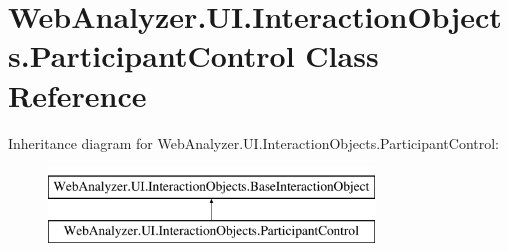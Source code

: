 \hypertarget{class_web_analyzer_1_1_u_i_1_1_interaction_objects_1_1_participant_control}{}\section{Web\+Analyzer.\+U\+I.\+Interaction\+Objects.\+Participant\+Control Class Reference}
\label{class_web_analyzer_1_1_u_i_1_1_interaction_objects_1_1_participant_control}
Inheritance diagram for Web\+Analyzer.\+U\+I.\+Interaction\+Objects.\+Participant\+Control\+:\begin{figure}[H]
\begin{center}
\leavevmode
\includegraphics[height=2.000000cm]{class_web_analyzer_1_1_u_i_1_1_interaction_objects_1_1_participant_control}
\end{center}
\end{figure}
